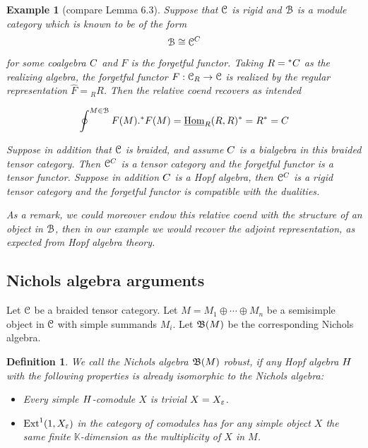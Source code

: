 \documentclass[a4paper, reqno]{amsart}
\newtheorem{definition}[theorem]{Definition}
\newtheorem{example}[theorem]{Example}
\theoremstyle{introTheorems}
\def\KK{\mathbb{K}}
\newcommand\Hom{\textup{Hom}}
\newcommand{\Ext}{\textup{Ext}}
\renewcommand{\1}{\mathbbold{1}}
\begin{document}

\begin{example}[compare \cite{LM25} Lemma 6.3]
Suppose that $\mathcal{C}$ is rigid and $\mathcal{B}$ is a module category which is known to be of the form 
$$ \mathcal{B}\cong \mathcal{C}^C$$
for some coalgebra $C$ and $F$ is the forgetful functor. 
Taking $R={^*}C$ as the realizing algebra, the forgetful functor $F:\mathcal{C}_R\to \mathcal{C}$ is realized by the regular representation $\hat{F}={_R}R$. Then the relative coend recovers as intended

$$\oint^{M\in\catB} F(M).{^*}F(M) =\underline{\Hom}_R(R,R)^*=R^*=\Hdual$$

Suppose in addition that $\mathcal{C}$ is braided, and assume $C$ is a bialgebra in this braided tensor category. Then $\mathcal{C}^C$ is a tensor category and the forgetful functor is a tensor functor. Suppose in addition $C$ is a Hopf algebra, then $\mathcal{C}^C$ is a rigid tensor category and the forgetful functor is compatible with the dualities. 

As a remark, we could moreover endow this relative coend with the structure of an object in $\mathcal{B}$, then in our example we would recover the adjoint representation, as expected from Hopf algebra theory.
\end{example}

\subsection{Nichols algebra arguments}\label{subsec:NicholsArguments}

Let $\mathcal{C}$ be a braided tensor category. Let $M=M_1\oplus\cdots\oplus M_n$ be a semisimple object in $\mathcal{C}$ with simple summands $M_i$. Let $\mathfrak{B}(M)$ be the corresponding Nichols algebra. 

\begin{definition}\label{def:robust}
We call the Nichols algebra $\mathfrak{B}(M)$ \emph{robust}, if any Hopf algebra $H$ with the following properties is already isomorphic to the Nichols algebra:
\begin{itemize}
    \item Every simple $H$-comodule $X$ is trivial $X=X_\varepsilon$.
    \item $\Ext^1(1,X_\NicholsAlgebraCounit)$ in the category of comodules has for any simple object $X$ the same finite $\KK$-dimension as the multiplicity of $X$ in $M$.  
\end{itemize}
\end{definition}
\end{document}

